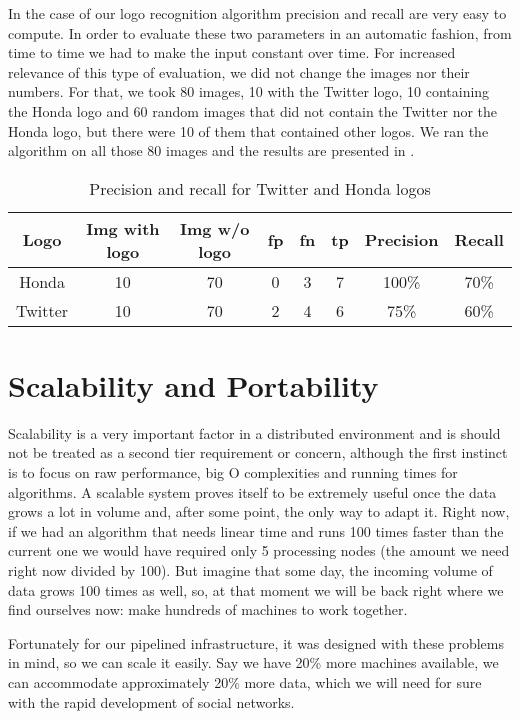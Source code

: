 In the case of our logo recognition algorithm precision and recall are very
easy to compute. In order to evaluate these two parameters in an automatic
fashion, from time to time we had to make the input constant over time. For
increased relevance of this type of evaluation, we did not change the images
nor their numbers. For that, we took 80 images, 10 with the Twitter logo, 10
containing the Honda logo and 60 random images that did not contain the
Twitter nor the Honda logo, but there were 10 of them that contained other
logos. We ran the algorithm on all those 80 images and the results are
presented in .

\begin{center}
\begin{table}[htb]
\centering
  \caption{Precision and recall for Twitter and Honda logos}
  \begin{tabular}{|c|c|c|c|c|c|c|c|}
    Logo & Img with logo & Img w/o logo & fp &
    fn & tp & Precision & Recall \\
    \hline
    Honda & 10 & 70 & 0 & 3 & 7 & 100\% & 70\% \\
    \hline
    Twitter & 10 & 70 & 2 & 4 & 6 & 75\% & 60\% \\
    \hline
  \end{tabular}
  \label{table:prec-rec}
\end{table}
\end{center}

\section{Scalability and Portability}

Scalability is a very important factor in a distributed environment and
is should not be treated as a second tier requirement or concern, although the
first instinct is to focus on raw performance, big O complexities and running
times for algorithms. A scalable system proves itself to be extremely useful
once the data grows a lot in volume and, after some point, the only way to
adapt it. Right now, if we had an algorithm that needs linear time and runs
100 times faster than the current one we would have required only 5 processing nodes
(the amount we need right now divided by 100). But imagine that some day, the incoming volume
of data grows 100 times as well, so, at that moment we will be back right where we find
ourselves now: make hundreds of machines to work together.

Fortunately for our pipelined infrastructure, it was designed with these
problems in mind, so we can scale it easily. Say we have 20\% more machines
available, we can accommodate approximately 20\% more data, which we will need
for sure with the rapid development of social networks.

